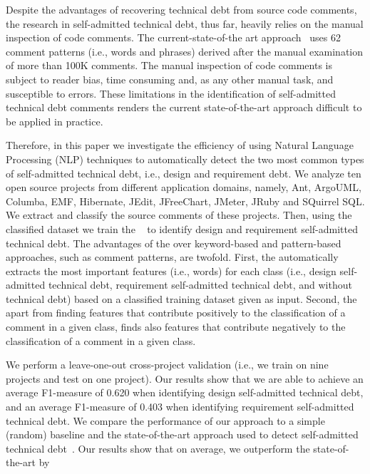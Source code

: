 \documentclass[10pt,journal,compsoc]{IEEEtran}
\newcommand{\SATD}{self-admitted technical debt\xspace}
\newcommand{\revised}[2]{\setlength{\marginparwidth}{1.2cm} \marginpar{\fbox{#2}}{\color{red}{#1}}}
\begin{document}
Despite the advantages of recovering technical debt from source code comments, the research in \SATD, thus far, heavily relies on the manual inspection of code comments. The current-state-of-the art approach~\cite{Potdar2014ICSME} uses 62 comment patterns (i.e., words and phrases) derived after the manual examination of more than 100K comments. The manual inspection of code comments is subject to reader bias, time consuming and, as any other manual task, and susceptible to errors. These limitations in the identification of \SATD comments renders the current state-of-the-art approach difficult to be applied in practice.

Therefore, in this paper we investigate the efficiency of using Natural Language Processing (NLP) techniques to automatically detect the two most common types of \SATD, i.e., design and requirement debt. We analyze ten open source projects from different application domains, namely, Ant, ArgoUML, Columba, EMF, Hibernate, JEdit, JFreeChart, JMeter, JRuby and SQuirrel SQL. We extract and classify the source comments of these projects. Then, using the classified dataset we train the \revised{Stanford Classifier}{R2-11}~\cite{Manning2014ACL} to identify design and requirement \SATD.
The advantages of the \revised{maximum entropy classifier}{R2-11} over keyword-based and pattern-based approaches, such as comment patterns, are twofold. First, the \revised{maximum entropy classifier}{R2-11} automatically extracts the most important features (i.e., words) for each class (i.e., design \SATD, requirement \SATD, and without technical debt) based on a classified training dataset given as input. Second, the \revised{maximum entropy classifier}{R2-11} apart from finding features that contribute positively to the classification of a comment in a given class, finds also features that contribute negatively to the classification of a comment in a given class.

We perform a leave-one-out cross-project validation (i.e., we train on nine projects and test on one project). Our results show that we are able to  achieve an average F1-measure of 0.620 when identifying design \SATD, and an average F1-measure of 0.403 when identifying requirement \SATD. We compare the performance of our approach to a simple (random) baseline and the state-of-the-art approach used to detect \SATD~\cite{Potdar2014ICSME}. Our results show that on average, we outperform the state-of-the-art by\revised{2.3 times, when detecting design debt, and by 6 times when detecting requirement debt.}{R1-8}
\end{document}
